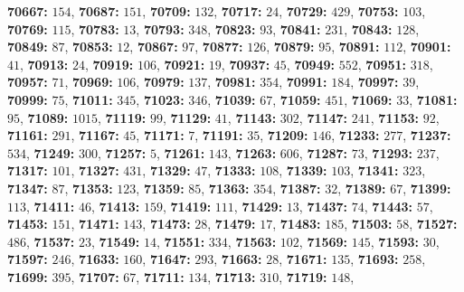 \textsf{\bfseries 70667:} $154$, \textsf{\bfseries 70687:} $151$, \textsf{\bfseries 70709:} $132$, \textsf{\bfseries 70717:} $24$, \textsf{\bfseries 70729:} $429$, \textsf{\bfseries 70753:} $103$, \textsf{\bfseries 70769:} $115$, \textsf{\bfseries 70783:} $13$, \textsf{\bfseries 70793:} $348$, \textsf{\bfseries 70823:} $93$, \textsf{\bfseries 70841:} $231$, \textsf{\bfseries 70843:} $128$, \textsf{\bfseries 70849:} $87$, \textsf{\bfseries 70853:} $12$, \textsf{\bfseries 70867:} $97$, \textsf{\bfseries 70877:} $126$, \textsf{\bfseries 70879:} $95$, \textsf{\bfseries 70891:} $112$, \textsf{\bfseries 70901:} $41$, \textsf{\bfseries 70913:} $24$, \textsf{\bfseries 70919:} $106$, \textsf{\bfseries 70921:} $19$, \textsf{\bfseries 70937:} $45$, \textsf{\bfseries 70949:} $552$, \textsf{\bfseries 70951:} $318$, \textsf{\bfseries 70957:} $71$, \textsf{\bfseries 70969:} $106$, \textsf{\bfseries 70979:} $137$, \textsf{\bfseries 70981:} $354$, \textsf{\bfseries 70991:} $184$, \textsf{\bfseries 70997:} $39$, \textsf{\bfseries 70999:} $75$, \textsf{\bfseries 71011:} $345$, \textsf{\bfseries 71023:} $346$, \textsf{\bfseries 71039:} $67$, \textsf{\bfseries 71059:} $451$, \textsf{\bfseries 71069:} $33$, \textsf{\bfseries 71081:} $95$, \textsf{\bfseries 71089:} $1015$, \textsf{\bfseries 71119:} $99$, \textsf{\bfseries 71129:} $41$, \textsf{\bfseries 71143:} $302$, \textsf{\bfseries 71147:} $241$, \textsf{\bfseries 71153:} $92$, \textsf{\bfseries 71161:} $291$, \textsf{\bfseries 71167:} $45$, \textsf{\bfseries 71171:} $7$, \textsf{\bfseries 71191:} $35$, \textsf{\bfseries 71209:} $146$, \textsf{\bfseries 71233:} $277$, \textsf{\bfseries 71237:} $534$, \textsf{\bfseries 71249:} $300$, \textsf{\bfseries 71257:} $5$, \textsf{\bfseries 71261:} $143$, \textsf{\bfseries 71263:} $606$, \textsf{\bfseries 71287:} $73$, \textsf{\bfseries 71293:} $237$, \textsf{\bfseries 71317:} $101$, \textsf{\bfseries 71327:} $431$, \textsf{\bfseries 71329:} $47$, \textsf{\bfseries 71333:} $108$, \textsf{\bfseries 71339:} $103$, \textsf{\bfseries 71341:} $323$, \textsf{\bfseries 71347:} $87$, \textsf{\bfseries 71353:} $123$, \textsf{\bfseries 71359:} $85$, \textsf{\bfseries 71363:} $354$, \textsf{\bfseries 71387:} $32$, \textsf{\bfseries 71389:} $67$, \textsf{\bfseries 71399:} $113$, \textsf{\bfseries 71411:} $46$, \textsf{\bfseries 71413:} $159$, \textsf{\bfseries 71419:} $111$, \textsf{\bfseries 71429:} $13$, \textsf{\bfseries 71437:} $74$, \textsf{\bfseries 71443:} $57$, \textsf{\bfseries 71453:} $151$, \textsf{\bfseries 71471:} $143$, \textsf{\bfseries 71473:} $28$, \textsf{\bfseries 71479:} $17$, \textsf{\bfseries 71483:} $185$, \textsf{\bfseries 71503:} $58$, \textsf{\bfseries 71527:} $486$, \textsf{\bfseries 71537:} $23$, \textsf{\bfseries 71549:} $14$, \textsf{\bfseries 71551:} $334$, \textsf{\bfseries 71563:} $102$, \textsf{\bfseries 71569:} $145$, \textsf{\bfseries 71593:} $30$, \textsf{\bfseries 71597:} $246$, \textsf{\bfseries 71633:} $160$, \textsf{\bfseries 71647:} $293$, \textsf{\bfseries 71663:} $28$, \textsf{\bfseries 71671:} $135$, \textsf{\bfseries 71693:} $258$, \textsf{\bfseries 71699:} $395$, \textsf{\bfseries 71707:} $67$, \textsf{\bfseries 71711:} $134$, \textsf{\bfseries 71713:} $310$, \textsf{\bfseries 71719:} $148$, 
